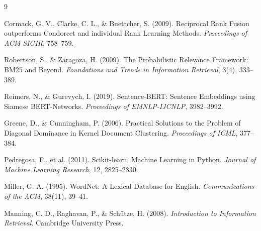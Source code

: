 \documentclass[11pt,a4paper]{article}
\begin{document}
\newpage

\begingroup
\small

\begin{thebibliography}{9}

Cormack, G. V., Clarke, C. L., \& Buettcher, S. (2009). Reciprocal Rank Fusion outperforms Condorcet and individual Rank Learning Methods. \textit{Proceedings of ACM SIGIR}, 758--759.

Robertson, S., \& Zaragoza, H. (2009). The Probabilistic Relevance Framework: BM25 and Beyond. \textit{Foundations and Trends in Information Retrieval}, 3(4), 333--389.

Reimers, N., \& Gurevych, I. (2019). Sentence-BERT: Sentence Embeddings using Siamese BERT-Networks. \textit{Proceedings of EMNLP-IJCNLP}, 3982--3992.

Greene, D., \& Cunningham, P. (2006). Practical Solutions to the Problem of Diagonal Dominance in Kernel Document Clustering. \textit{Proceedings of ICML}, 377--384.

Pedregosa, F., et al. (2011). Scikit-learn: Machine Learning in Python. \textit{Journal of Machine Learning Research}, 12, 2825--2830.

Miller, G. A. (1995). WordNet: A Lexical Database for English. \textit{Communications of the ACM}, 38(11), 39--41.

Manning, C. D., Raghavan, P., \& Sch\"{u}tze, H. (2008). \textit{Introduction to Information Retrieval}. Cambridge University Press.

\end{thebibliography}
\endgroup
\end{document}
